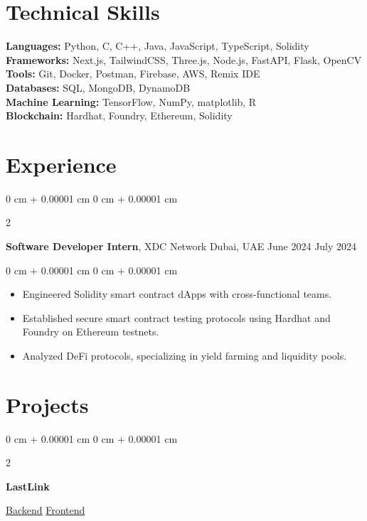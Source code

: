 \documentclass[10pt, letterpaper]{article}
\newenvironment{highlights}{
    \begin{itemize}[
        topsep=0.10 cm,
        parsep=0.10 cm,
        partopsep=0pt,
        itemsep=0pt,
        leftmargin=0 cm + 10pt
    ]
}{
    \end{itemize}
}
\newenvironment{onecolentry}{
    \begin{adjustwidth}{
        0 cm + 0.00001 cm
    }{
        0 cm + 0.00001 cm
    }
}{
    \end{adjustwidth}
}
\newenvironment{twocolentry}[2][]{
    \onecolentry
    \def\secondColumn{#2}
    \setcolumnwidth{\fill, 4.5 cm}
    \begin{paracol}{2}
}{
    \switchcolumn \raggedleft \secondColumn
    \end{paracol}
    \endonecolentry
}
\begin{document}
\section{Technical Skills}
\textbf{Languages:} Python, C, C++, Java, JavaScript, TypeScript, Solidity \\
\textbf{Frameworks:} Next.js, TailwindCSS, Three.js, Node.js, FastAPI, Flask, OpenCV \\
\textbf{Tools:} Git, Docker, Postman, Firebase, AWS, Remix IDE \\
\textbf{Databases:} SQL, MongoDB, DynamoDB \\
\textbf{Machine Learning:} TensorFlow, NumPy, matplotlib, R \\
\textbf{Blockchain:} Hardhat, Foundry, Ethereum, Solidity

    \section{Experience}

        \begin{twocolentry}{
            June 2024 \textendash July 2024 
        }
            \textbf{Software Developer Intern}, XDC Network  \textendash  Dubai, UAE\end{twocolentry}

        \vspace{0.10 cm}
        \begin{onecolentry}
            \begin{highlights}
                \item Engineered Solidity smart contract dApps with cross-functional teams.
                \item Established secure smart contract testing protocols using Hardhat and Foundry on Ethereum testnets.
                \item Analyzed DeFi protocols, specializing in yield farming and liquidity pools.
            \end{highlights}
        \end{onecolentry}

\section{Projects}
        
\begin{twocolentry}{
    \href{https://github.com/anshmehta7x/lastlink-backend}{Backend} \AND 
    \href{https://github.com/anshmehta7x/lastlink-frontend}{Frontend}
}
    \textbf{LastLink}
\end{twocolentry}
\end{document}
